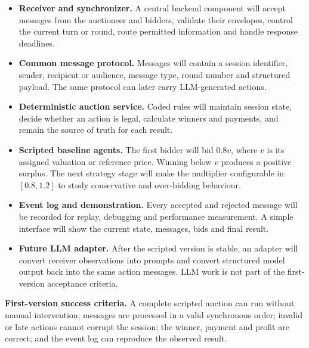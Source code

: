\documentclass[10pt]{article}
\newcommand{\sectiontitle}[1]{%
  \vspace{3pt}{\large\bfseries #1}\par\vspace{1pt}}
\begin{document}
\sectiontitle{Proposed Solution and Deliverables}
\begin{itemize}
  \item \textbf{Receiver and synchronizer.} A central backend component will accept messages from the auctioneer and bidders, validate their envelopes, control the current turn or round, route permitted information and handle response deadlines.
  \item \textbf{Common message protocol.} Messages will contain a session identifier, sender, recipient or audience, message type, round number and structured payload. The same protocol can later carry LLM-generated actions.
  \item \textbf{Deterministic auction service.} Coded rules will maintain session state, decide whether an action is legal, calculate winners and payments, and remain the source of truth for each result.
  \item \textbf{Scripted baseline agents.} The first bidder will bid $0.8v$, where $v$ is its assigned valuation or reference price. Winning below $v$ produces a positive surplus. The next strategy stage will make the multiplier configurable in $[0.8,1.2]$ to study conservative and over-bidding behaviour.
  \item \textbf{Event log and demonstration.} Every accepted and rejected message will be recorded for replay, debugging and performance measurement. A simple interface will show the current state, messages, bids and final result.
  \item \textbf{Future LLM adapter.} After the scripted version is stable, an adapter will convert receiver observations into prompts and convert structured model output back into the same action messages. LLM work is not part of the first-version acceptance criteria.
\end{itemize}

\textbf{First-version success criteria.} A complete scripted auction can run without manual intervention; messages are processed in a valid synchronous order; invalid or late actions cannot corrupt the session; the winner, payment and profit are correct; and the event log can reproduce the observed result.

\newpage

\sectiontitle{Backend Architecture}
\end{document}
